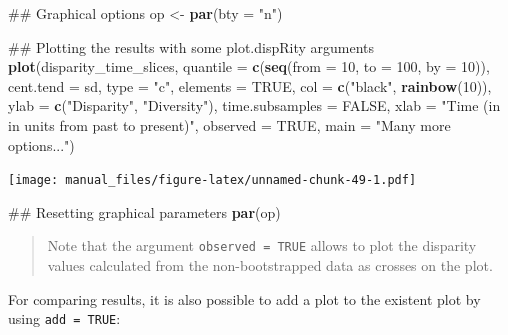 \documentclass[]{book}
\newenvironment{Shaded}{\begin{snugshade}}{\end{snugshade}}
\newcommand{\KeywordTok}[1]{\textcolor[rgb]{0.13,0.29,0.53}{\textbf{#1}}}
\newcommand{\DataTypeTok}[1]{\textcolor[rgb]{0.13,0.29,0.53}{#1}}
\newcommand{\DecValTok}[1]{\textcolor[rgb]{0.00,0.00,0.81}{#1}}
\newcommand{\StringTok}[1]{\textcolor[rgb]{0.31,0.60,0.02}{#1}}
\newcommand{\OtherTok}[1]{\textcolor[rgb]{0.56,0.35,0.01}{#1}}
\newcommand{\NormalTok}[1]{#1}
\theoremstyle{definition}
\theoremstyle{definition}
\theoremstyle{remark}
\begin{document}
\begin{Shaded}
\begin{Highlighting}[]
\NormalTok{## Graphical options}
\NormalTok{op <-}\StringTok{ }\KeywordTok{par}\NormalTok{(}\DataTypeTok{bty =} \StringTok{"n"}\NormalTok{)}

\NormalTok{## Plotting the results with some plot.dispRity arguments}
\KeywordTok{plot}\NormalTok{(disparity_time_slices, }\DataTypeTok{quantile =} \KeywordTok{c}\NormalTok{(}\KeywordTok{seq}\NormalTok{(}\DataTypeTok{from =} \DecValTok{10}\NormalTok{, }\DataTypeTok{to =} \DecValTok{100}\NormalTok{, }\DataTypeTok{by =} \DecValTok{10}\NormalTok{)),}
    \DataTypeTok{cent.tend =}\NormalTok{ sd, }\DataTypeTok{type =} \StringTok{"c"}\NormalTok{, }\DataTypeTok{elements =} \OtherTok{TRUE}\NormalTok{, }\DataTypeTok{col =} \KeywordTok{c}\NormalTok{(}\StringTok{"black"}\NormalTok{, }\KeywordTok{rainbow}\NormalTok{(}\DecValTok{10}\NormalTok{)),}
    \DataTypeTok{ylab =} \KeywordTok{c}\NormalTok{(}\StringTok{"Disparity"}\NormalTok{, }\StringTok{"Diversity"}\NormalTok{), }\DataTypeTok{time.subsamples =} \OtherTok{FALSE}\NormalTok{,}
    \DataTypeTok{xlab =} \StringTok{"Time (in in units from past to present)"}\NormalTok{, }\DataTypeTok{observed =} \OtherTok{TRUE}\NormalTok{,}
    \DataTypeTok{main =} \StringTok{"Many more options..."}\NormalTok{)}
\end{Highlighting}
\end{Shaded}

\texttt{[image: manual\_files/figure-latex/unnamed-chunk-49-1.pdf]}

\begin{Shaded}
\begin{Highlighting}[]
\NormalTok{## Resetting graphical parameters}
\KeywordTok{par}\NormalTok{(op)}
\end{Highlighting}
\end{Shaded}

\begin{quote}
Note that the argument \texttt{observed\ =\ TRUE} allows to plot the
disparity values calculated from the non-bootstrapped data as crosses on
the plot.
\end{quote}

For comparing results, it is also possible to add a plot to the existent
plot by using \texttt{add\ =\ TRUE}:
\end{document}
